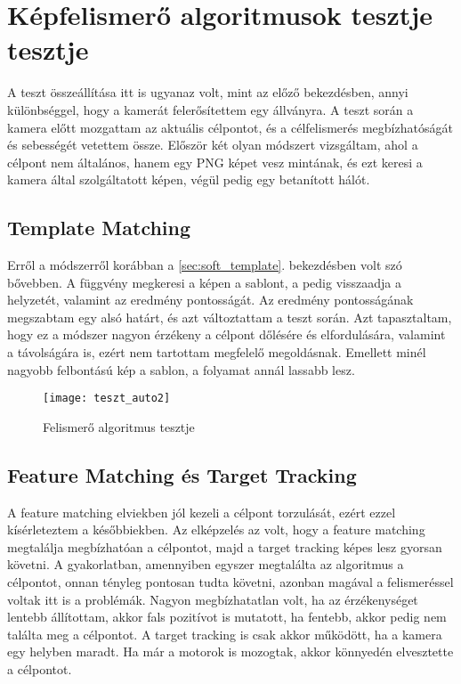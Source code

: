 \pagebreak


\section{Képfelismerő algoritmusok tesztje tesztje}
A teszt összeállítása itt is ugyanaz volt, mint az előző bekezdésben, annyi különbséggel, hogy a kamerát felerősítettem egy állványra. A teszt során a kamera előtt mozgattam az aktuális célpontot, és a célfelismerés megbízhatóságát és sebességét vetettem össze. Először két olyan módszert vizsgáltam, ahol a célpont nem általános, hanem egy PNG képet vesz mintának, és ezt keresi a kamera által szolgáltatott képen, végül pedig egy betanított hálót.

\subsection*{Template Matching}
Erről a módszerről korábban a \ref{sec:soft_template}. bekezdésben volt szó bővebben. A  függvény megkeresi a képen a sablont, a  pedig visszaadja a helyzetét, valamint az eredmény pontosságát. Az eredmény pontosságának megszabtam egy alsó határt, és azt változtattam a teszt során. Azt tapasztaltam, hogy ez a módszer nagyon érzékeny a célpont dőlésére és elfordulására, valamint a távolságára is, ezért nem tartottam megfelelő megoldásnak. Emellett minél nagyobb felbontású kép a sablon, a folyamat annál lassabb lesz.
\begin{figure}[h!]
	\centering
	\texttt{[image: teszt\_auto2]}
	\caption{Felismerő algoritmus tesztje}
	\label{fig:teszt_auto2}
\end{figure}
\pagebreak

\subsection*{Feature Matching és Target Tracking}
A feature matching elviekben jól kezeli a célpont torzulását, ezért ezzel kísérleteztem a későbbiekben. Az elképzelés az volt, hogy a feature matching megtalálja megbízhatóan a célpontot, majd a target tracking képes lesz gyorsan követni. A gyakorlatban, amennyiben egyszer megtalálta az algoritmus a célpontot, onnan tényleg pontosan tudta követni, azonban magával a felismeréssel voltak itt is a problémák. Nagyon megbízhatatlan volt, ha az érzékenységet lentebb állítottam, akkor fals pozitívot is mutatott, ha fentebb, akkor pedig nem találta meg a célpontot. A target tracking is csak akkor működött, ha a kamera egy helyben maradt. Ha már a motorok is mozogtak, akkor könnyedén elvesztette a célpontot.

